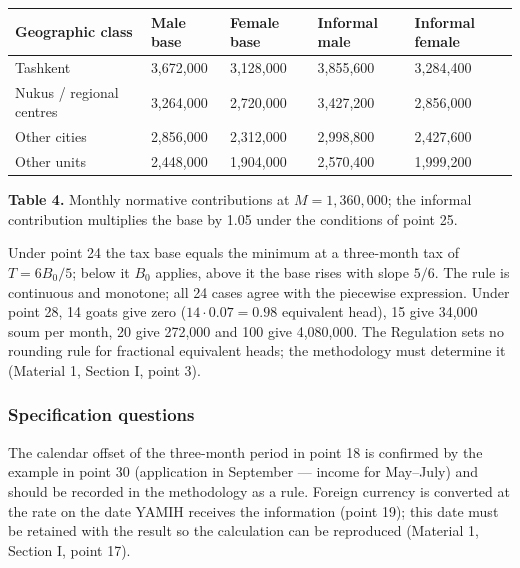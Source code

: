 \documentclass[14pt,a4paper]{extarticle}
\begin{document}
\begingroup\fontsize{11bp}{13.2bp}\selectfont
\begin{longtable}{p{} p{} p{} p{} p{}}
\toprule
Geographic class & Male base & Female base & Informal male & Informal female \\
\midrule
\endhead
Tashkent & 3,672,000 & 3,128,000 & 3,855,600 & 3,284,400 \\
Nukus / regional centres & 3,264,000 & 2,720,000 & 3,427,200 & 2,856,000 \\
Other cities & 2,856,000 & 2,312,000 & 2,998,800 & 2,427,600 \\
Other units & 2,448,000 & 1,904,000 & 2,570,400 & 1,999,200 \\
\bottomrule
\end{longtable}
\endgroup
\textbf{Table 4.} Monthly normative contributions at $M=1{,}360{,}000$; the informal contribution multiplies the base by 1.05 under the conditions of point 25.

Under point 24 the tax base equals the minimum at a three-month tax of $T=6B_0/5$; below it $B_0$ applies, above it the base rises with slope $5/6$. The rule is continuous and monotone; all 24 cases agree with the piecewise expression. Under point 28, 14 goats give zero ($14\cdot0.07=0.98$ equivalent head), 15 give 34,000 soum per month, 20 give 272,000 and 100 give 4,080,000. The Regulation sets no rounding rule for fractional equivalent heads; the methodology must determine it (Material 1, Section I, point 3).

\subsubsection{Specification questions}\label{res:spec}
The calendar offset of the three-month period in point 18 is confirmed by the example in point 30 (application in September — income for May–July) and should be recorded in the methodology as a rule. Foreign currency is converted at the rate on the date YAMIH receives the information (point 19); this date must be retained with the result so the calculation can be reproduced (Material 1, Section I, point 17).
\end{document}

